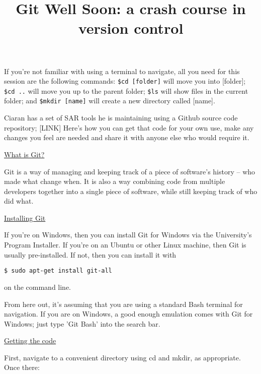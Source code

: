\documentclass[11pt, a4paper, english]{article}
\newenvironment{wrapbox}
	{
		\begin{tcolorbox}
	}
	{
		\end{tcolorbox}
	}
\begin{document}
\title{Git Well Soon: a crash course in version control}

\maketitle

\begin{wrapbox}
If you're not familiar with using a terminal to navigate, all you need for this session are the following commands: \verb|$cd [folder]| will move you into [folder]; \verb|$cd ..| will move you up to the parent folder; \verb|$ls| will show files in the current folder; and \verb|$mkdir [name]| will create a new directory called [name].
\end{wrapbox}

Ciaran has a set of SAR tools he is maintaining using a Github source code repository; [LINK] Here's how you can get that code for your own use, make any changes you feel are needed and share it with anyone else who would require it.

\underline{What is Git?}

Git is a way of managing and keeping track of a piece of software's history -- who made what change when. It is also a way combining code from multiple developers together into a single piece of software, while still keeping track of who did what.



\underline{Installing Git}

If you're on Windows, then you can install Git for Windows via the University's Program Installer. If you're on an Ubuntu or other Linux machine, then Git is usually pre-installed. If not, then you can install it with

\begin{verbatim}
$ sudo apt-get install git-all
\end{verbatim}

on the command line.

\begin{wrapbox}
From here out, it's assuming that you are using a standard Bash terminal for navigation. If you are on Windows, a good enough emulation comes with Git for Windows; just type 'Git Bash' into the search bar.
\end{wrapbox}

\underline{Getting the code}

First, navigate to a convenient directory using cd and mkdir, as appropriate. Once there:
\end{document}
